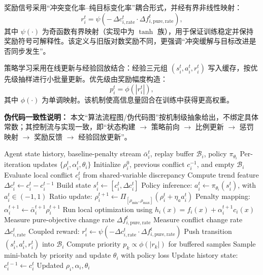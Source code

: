 \documentclass[conference]{IEEEtran}
\begin{document}
奖励信号采用“冲突变化率--纯目标变化率”耦合形式，并经有界非线性映射：
\[
r_i^t=\psi\!\left(-\,\Delta c_{i,\mathrm{rate}}^t\cdot \Delta f_{i,\mathrm{pure,rate}}^t\right),
\]
其中 \(\psi(\cdot)\) 为奇函数有界映射（实现中为 \(\tanh\) 族），用于保证训练稳定并保持奖励符号可解释性。该定义与旧版对数奖励不同，更强调“冲突缓解与目标改进是否同步发生”。

策略学习采用在线更新与经验回放结合：经验三元组 \((s_i^t,a_i^t,r_i^t)\) 写入缓存，按优先级抽样进行小批量更新。优先级由奖励幅度构造：
\[
p_i^t=\phi\!\left(|r_i^t|\right),
\]
其中 \(\phi(\cdot)\) 为单调映射。该机制使高信息量回合在训练中获得更高权重。

\textbf{伪代码一致性说明：} 本文“算法流程图/伪代码图”按机制级抽象给出，不绑定具体常数；其控制流与实现一致，即“状态构建 \(\rightarrow\) 策略前向 \(\rightarrow\) 比例更新 \(\rightarrow\) 惩罚映射 \(\rightarrow\) 奖励反馈 \(\rightarrow\) 经验回放更新”。

\begin{algorithm}[t]
  \footnotesize
  \caption{RL-Based Adaptive Penalty Update (Abstract)}
  \label{alg:rl_penalty_update}
  \begin{algorithmic}[1]
  \Require Agent state history, baseline-penalty stream $\bar{\alpha}_i^t$, replay buffer $\mathcal{B}_i$, policy $\pi_{\theta_i}$
  \Ensure Per-iteration updates $\{\rho_i^t,\alpha_i^t,\theta_i\}$
  \State Initialize $\rho_i^0$, previous conflict $c_i^{-1}$, and empty $\mathcal{B}_i$
    \State Evaluate local conflict $c_i^t$ from shared-variable discrepancy
    \State Compute trend feature $\Delta c_i^t \gets c_i^t-c_i^{t-1}$
    \State Build state $s_i^t \gets [c_i^t,\Delta c_i^t]$
    \State Policy inference: $a_i^t \gets \pi_{\theta_i}(s_i^t)$, with $a_i^t\in(-1,1)$
    \State Ratio update: $\rho_i^{t+1}\gets \Pi_{[\rho_{\min},\rho_{\max}]}\!\left(\rho_i^t+\eta_a a_i^t\right)$
    \State Penalty mapping: $\alpha_i^{t+1}\gets \bar{\alpha}_i^{t+1}\rho_i^{t+1}$
    \State Run local optimization using $h_i(x)=f_i(x)+\alpha_i^{t+1}c_i(x)$
    \State Measure pure-objective change rate $\Delta f_{i,\mathrm{pure,rate}}^t$
    \State Measure conflict change rate $\Delta c_{i,\mathrm{rate}}^t$
    \State Coupled reward:
    \Statex \hspace{1.5em}$r_i^t\gets \psi\!\left(-\Delta c_{i,\mathrm{rate}}^t\cdot \Delta f_{i,\mathrm{pure,rate}}^t\right)$
    \State Push transition $(s_i^t,a_i^t,r_i^t)$ into $\mathcal{B}_i$
      \State Compute priority $p_k\propto \phi(|r_k|)$ for buffered samples
      \State Sample mini-batch by priority and update $\theta_i$ with policy loss
    \EndIf
    \State Update history state: $c_i^{t-1}\gets c_i^t$
  \EndFor
  \State \Return Updated $\rho_i,\alpha_i,\theta_i$
  \end{algorithmic}
  \end{algorithm}
\end{document}
